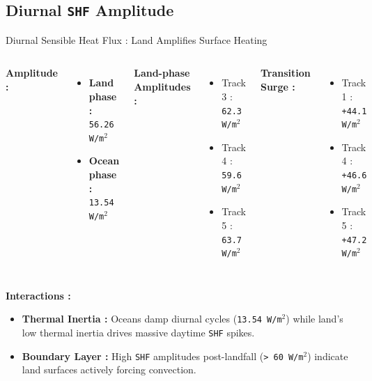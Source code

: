 \documentclass[8pt, aspectratio=169]{beamer}
\begin{document}
\subsection{Diurnal \texttt{SHF} Amplitude} %
\begin{frame}{Diurnal Sensible Heat Flux : Land Amplifies Surface Heating}
    \begin{columns}[T]
            \footnotesize
            \textbf{Amplitude :}
            \begin{itemize}
                \item \textbf{Land phase :} \texttt{56.26 W/m$^2$}
                \item \textbf{Ocean phase :} \texttt{13.54 W/m$^2$}
            \end{itemize}

            \footnotesize
            \textbf{Land-phase Amplitudes :}
            \begin{itemize}
                \item Track 3 : \texttt{62.3 W/m$^2$}
                \item Track 4 : \texttt{59.6 W/m$^2$}
                \item Track 5 : \texttt{63.7 W/m$^2$}
            \end{itemize}

            \footnotesize
            \textbf{Transition Surge :}
            \begin{itemize}
                \item Track 1 : \texttt{+44.1 W/m$^2$}
                \item Track 4 : \texttt{+46.6 W/m$^2$}
                \item Track 5 : \texttt{+47.2 W/m$^2$}
            \end{itemize}
    \end{columns}

    \vspace{0.4cm}
    \footnotesize
    \textbf{Interactions :}
    \begin{itemize}
        \item \textbf{Thermal Inertia :} Oceans damp diurnal cycles (\texttt{13.54 W/m$^2$}) while land's low thermal inertia drives massive daytime \texttt{SHF} spikes.
        \item \textbf{Boundary Layer :} High \texttt{SHF} amplitudes post-landfall (\texttt{> 60 W/m$^2$}) indicate land surfaces actively forcing convection.
    \end{itemize}
\end{frame}
\end{document}
